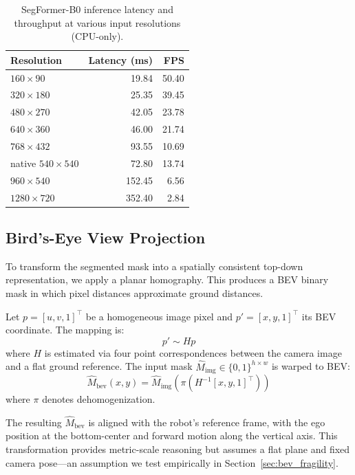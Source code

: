 \documentclass[a4paper,fleqn,10pt]{cas-dc}
\begin{document}
\begin{table}[h]
\centering
\caption{SegFormer-B0 inference latency and throughput at various input resolutions (CPU-only).}
\label{tab:segformer_fps}
\begin{tabular}{lrr}
\toprule
Resolution & Latency (ms) & FPS \\
\midrule
$160{\times}90$         & 19.84 & 50.40 \\
$320{\times}180$        & 25.35 & 39.45 \\
$480{\times}270$        & 42.05 & 23.78 \\
$640{\times}360$        & 46.00 & 21.74 \\
$768{\times}432$        & 93.55 & 10.69 \\
native $540{\times}540$ & 72.80 & 13.74 \\
$960{\times}540$        & 152.45 & 6.56 \\
$1280{\times}720$       & 352.40 & 2.84 \\
\bottomrule
\end{tabular}
\end{table}



\subsection{Bird's-Eye View Projection}
\label{sec:bev}

To transform the segmented mask into a spatially consistent top-down representation, we apply a planar homography. This produces a BEV binary mask in which pixel distances approximate ground distances.

Let $p = [u, v, 1]^\top$ be a homogeneous image pixel and $p' = [x, y, 1]^\top$ its BEV coordinate. The mapping is:
\[
p' \sim H p
\]
where $H$ is estimated via four point correspondences between the camera image and a flat ground reference. The input mask $\widehat{M}_\text{img} \in \{0, 1\}^{h \times w}$ is warped to BEV:
\[
\widehat{M}_\text{bev}(x, y) = \widehat{M}_\text{img}\left( \pi(H^{-1} [x, y, 1]^\top) \right)
\]
where $\pi$ denotes dehomogenization.

The resulting $\widehat{M}_\text{bev}$ is aligned with the robot's reference frame, with the ego position at the bottom-center and forward motion along the vertical axis. This transformation provides metric-scale reasoning but assumes a flat plane and fixed camera pose---an assumption we test empirically in Section~\ref{sec:bev_fragility}.
\end{document}
